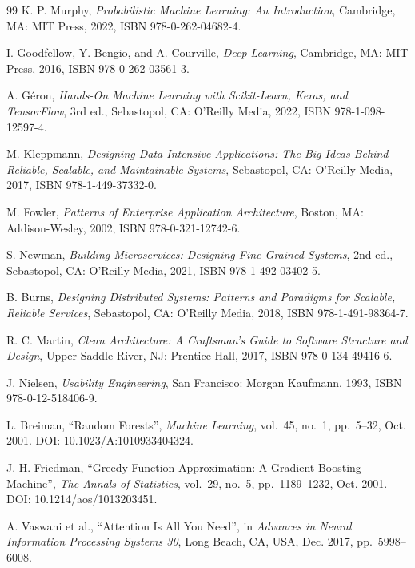 \documentclass[12pt, a4paper, oneside]{report}
\begin{document}
\begin{thebibliography}{99}
K. P. Murphy,
\textit{Probabilistic Machine Learning: An Introduction},
Cambridge, MA: MIT Press, 2022, ISBN 978-0-262-04682-4.

I. Goodfellow, Y. Bengio, and A. Courville,
\textit{Deep Learning},
Cambridge, MA: MIT Press, 2016, ISBN 978-0-262-03561-3.

A. G\'eron,
\textit{Hands-On Machine Learning with Scikit-Learn, Keras, and
TensorFlow}, 3rd ed., Sebastopol, CA: O'Reilly Media, 2022,
ISBN 978-1-098-12597-4.

M. Kleppmann,
\textit{Designing Data-Intensive Applications: The Big Ideas Behind
Reliable, Scalable, and Maintainable Systems},
Sebastopol, CA: O'Reilly Media, 2017, ISBN 978-1-449-37332-0.

M. Fowler,
\textit{Patterns of Enterprise Application Architecture},
Boston, MA: Addison-Wesley, 2002, ISBN 978-0-321-12742-6.

S. Newman,
\textit{Building Microservices: Designing Fine-Grained Systems},
2nd ed., Sebastopol, CA: O'Reilly Media, 2021,
ISBN 978-1-492-03402-5.

B. Burns,
\textit{Designing Distributed Systems: Patterns and Paradigms for
Scalable, Reliable Services},
Sebastopol, CA: O'Reilly Media, 2018, ISBN 978-1-491-98364-7.

R. C. Martin,
\textit{Clean Architecture: A Craftsman's Guide to Software Structure
and Design}, Upper Saddle River, NJ: Prentice Hall, 2017,
ISBN 978-0-134-49416-6.

J. Nielsen,
\textit{Usability Engineering},
San Francisco: Morgan Kaufmann, 1993, ISBN 978-0-12-518406-9.


L. Breiman,
``Random Forests'',
\textit{Machine Learning}, vol.~45, no.~1, pp.~5--32, Oct. 2001.
DOI: 10.1023/A:1010933404324.

J. H. Friedman,
``Greedy Function Approximation: A Gradient Boosting Machine'',
\textit{The Annals of Statistics}, vol.~29, no.~5, pp.~1189--1232,
Oct. 2001. DOI: 10.1214/aos/1013203451.

A. Vaswani et al.,
``Attention Is All You Need'',
in \textit{Advances in Neural Information Processing Systems 30},
Long Beach, CA, USA, Dec. 2017, pp.~5998--6008.


\end{thebibliography}
\end{document}
